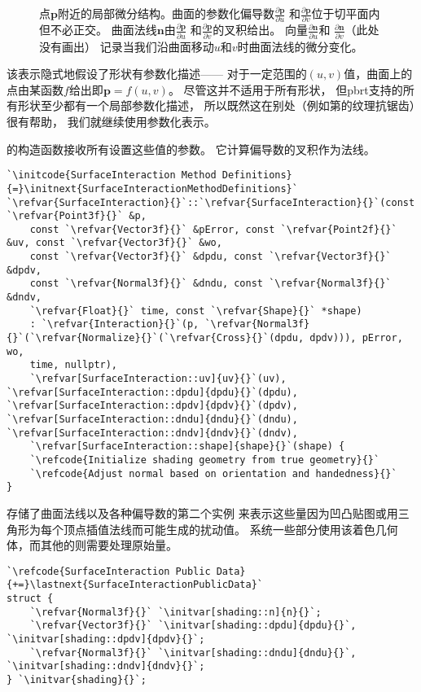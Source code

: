 \begin{figure}[htbp]
    \centering
    \caption{点$\bm p$附近的局部微分结构。曲面的参数化偏导数$\displaystyle\frac{\partial \bm p}{\partial u}$
        和$\displaystyle\frac{\partial \bm p}{\partial v}$位于切平面内但不必正交。
        曲面法线$\bm n$由$\displaystyle\frac{\partial \bm p}{\partial u}$
        和$\displaystyle\frac{\partial \bm p}{\partial v}$的叉积给出。
        向量$\displaystyle\frac{\partial \bm n}{\partial u}$和
        $\displaystyle\frac{\partial \bm n}{\partial v}$（此处没有画出）
        记录当我们沿曲面移动$u$和$v$时曲面法线的微分变化。}
    \label{fig:2.19}
\end{figure}

该表示隐式地假设了形状有参数化描述——
对于一定范围的$(u,v)$值，曲面上的点由某函数$f$给出即$\bm p=f(u,v)$。
尽管这并不适用于所有形状，
但pbrt支持的所有形状至少都有一个局部参数化描述，
所以既然这在别处（例如第的纹理抗锯齿）很有帮助，
我们就继续使用参数化表示。

的构造函数接收所有设置这些值的参数。
它计算偏导数的叉积作为法线。
\begin{lstlisting}
`\initcode{SurfaceInteraction Method Definitions}{=}\initnext{SurfaceInteractionMethodDefinitions}`
`\refvar{SurfaceInteraction}{}`::`\refvar{SurfaceInteraction}{}`(const `\refvar{Point3f}{}` &p,
    const `\refvar{Vector3f}{}` &pError, const `\refvar{Point2f}{}` &uv, const `\refvar{Vector3f}{}` &wo,
    const `\refvar{Vector3f}{}` &dpdu, const `\refvar{Vector3f}{}` &dpdv,
    const `\refvar{Normal3f}{}` &dndu, const `\refvar{Normal3f}{}` &dndv,
    `\refvar{Float}{}` time, const `\refvar{Shape}{}` *shape)
    : `\refvar{Interaction}{}`(p, `\refvar{Normal3f}{}`(`\refvar{Normalize}{}`(`\refvar{Cross}{}`(dpdu, dpdv))), pError, wo,
    time, nullptr),
    `\refvar[SurfaceInteraction::uv]{uv}{}`(uv), `\refvar[SurfaceInteraction::dpdu]{dpdu}{}`(dpdu), `\refvar[SurfaceInteraction::dpdv]{dpdv}{}`(dpdv), `\refvar[SurfaceInteraction::dndu]{dndu}{}`(dndu), `\refvar[SurfaceInteraction::dndv]{dndv}{}`(dndv),
    `\refvar[SurfaceInteraction::shape]{shape}{}`(shape) {
    `\refcode{Initialize shading geometry from true geometry}{}`
    `\refcode{Adjust normal based on orientation and handedness}{}`
}
\end{lstlisting}

存储了曲面法线以及各种偏导数的第二个实例
来表示这些量因为凹凸贴图或用三角形为每个顶点插值法线而可能生成的扰动值。
系统一些部分使用该着色几何体，而其他的则需要处理原始量。
\begin{lstlisting}
`\refcode{SurfaceInteraction Public Data}{+=}\lastnext{SurfaceInteractionPublicData}`
struct {
    `\refvar{Normal3f}{}` `\initvar[shading::n]{n}{}`;
    `\refvar{Vector3f}{}` `\initvar[shading::dpdu]{dpdu}{}`, `\initvar[shading::dpdv]{dpdv}{}`;
    `\refvar{Normal3f}{}` `\initvar[shading::dndu]{dndu}{}`, `\initvar[shading::dndv]{dndv}{}`;
} `\initvar{shading}{}`;
\end{lstlisting}

